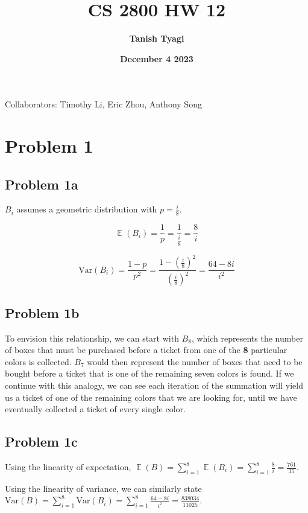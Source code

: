 \documentclass{article}
\title{\textbf{CS 2800 HW 12}}
\author{\textbf{Tanish Tyagi}}
\date{\textbf{December 4 2023}}
\newcommand{\Var}{\mathrm{Var}}
\DeclareMathOperator{\EX}{\mathbb{E}}
\begin{document}
\maketitle

\begin{center}
Collaborators: Timothy Li, Eric Zhou, Anthony Song
\end{center}

\section{Problem 1}

\subsection{Problem 1a}

$B_i$ assumes a geometric distribution with $p = \frac{i}{8}$.

$$
\EX(B_i) = \frac{1}{p} = \frac{1}{\frac{i}{8}} = \frac{8}{i}
$$

$$
\Var(B_i) = \frac{1 - p}{p^2} = \frac{1 - (\frac{i}{8})^2}{(\frac{i}{8})^2} = \frac{64 - 8i}{i^2}
$$

\subsection{Problem 1b}

To envision this relationship, we can start with $B_8$, which represents the number of boxes that must be purchased before a ticket from one of the \textbf{8} particular colors is collected. 
$B_7$ would then represent the number of boxes that need to be bought before a ticket that is one of the remaining seven colors is found. If we continue with this analogy, we can see each iteration of the summation will yield us a ticket of one of the remaining colors that we are looking for, until we have eventually collected a ticket of every single color.

\subsection{Problem 1c}

Using the linearity of expectation, $\EX(B) = \sum_{i = 1}^{8} \EX(B_i) = \sum_{i = 1}^{8} \frac{8}{i} = \frac{761}{35}$.

\noindent Using the linearity of variance, we can similarly state $\Var(B) = \sum_{i = 1}^{8}\Var(B_i) = \sum_{i = 1}^{8}\frac{64 - 8i}{i^2} = \frac{838034}{11025}$.
\end{document}
